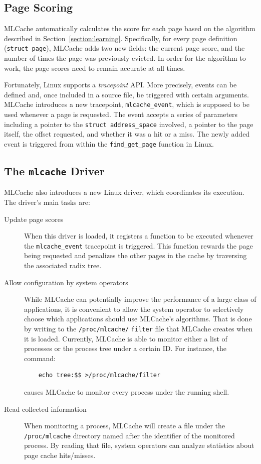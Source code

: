 \subsection{Page Scoring}

MLCache automatically calculates the score for each page based on the algorithm
described in Section~\ref{section:learning}. Specifically, for every page definition
(\texttt{struct page}), MLCache adds two new fields: the current page score, and
the number of times the page was previously evicted. In order for the algorithm
to work, the page scores need to remain accurate at all times.

Fortunately, Linux supports a \emph{tracepoint} API. More precisely, events can be
defined and, once included in a source file, be triggered with certain arguments.
MLCache introduces a new tracepoint, \texttt{mlcache\_event}, which is supposed
to be used whenever a page is requested. The event accepts a series of parameters
including a pointer to the \texttt{struct address\_space} involved, a pointer to the
page itself, the offset requested, and whether it was a hit or a miss. The newly
added event is triggered from within the \texttt{find\_get\_page} function in Linux.

\subsection{The \texttt{mlcache} Driver}

MLCache also introduces a new Linux driver, which coordinates its execution. The
driver's main tasks are:

\begin{description}
  \item[Update page scores] When this driver is loaded, it registers a function to be
    executed whenever the \texttt{mlcache\_event} tracepoint is triggered. This function
    rewards the page being requested and penalizes the other pages in the cache by
    traversing the associated radix tree.

  \item[Allow configuration by system operators] While
    MLCache can potentially improve the performance of a large class of applications,
    it is convenient to allow the system operator to selectively choose which applications
    should use MLCache's algorithms. That is done by writing to the \texttt{/proc/mlcache/}
    \texttt{filter}
    file that MLCache creates when it is loaded. Currently, MLCache is able to monitor either
    a list of processes or the process tree under a certain ID. For instance, the command:
\begin{verbatim}
    echo tree:$$ >/proc/mlcache/filter
\end{verbatim}
    causes MLCache to monitor every process
    under the running shell.

  \item[Read collected information] When monitoring a process, MLCache will create a file
    under the \texttt{/proc/mlcache} directory named after the identifier of the monitored process.
    By reading that file, system operators can analyze statistics about page cache hits/misses.
\end{description}

